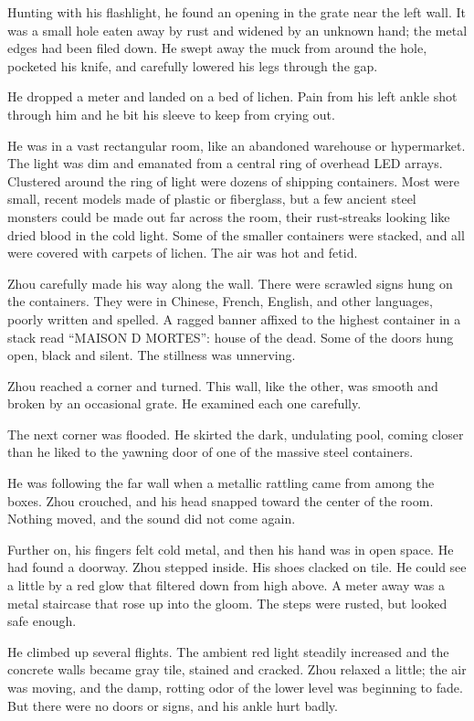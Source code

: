 \documentclass[10pt,b5paper]{article}
\begin{document}
Hunting with his flashlight, he found an opening in the grate near
the left wall. It was a small hole eaten away by rust and widened by
an unknown hand; the metal edges had been filed down. He swept away
the muck from around the hole, pocketed his knife, and carefully
lowered his legs through the gap.

He dropped a meter and landed on a bed of lichen. Pain from his left
ankle shot through him and he bit his sleeve to keep from crying out.

He was in a vast rectangular room, like an abandoned warehouse or
hypermarket. The light was dim and emanated from a central ring of
overhead LED arrays. Clustered around the ring of light were dozens
of shipping containers. Most were small, recent models made of
plastic or fiberglass, but a few ancient steel monsters could be made
out far across the room, their rust-streaks looking like dried blood
in the cold light. Some of the smaller containers were stacked, and
all were covered with carpets of lichen. The air was hot and fetid.

Zhou carefully made his way along the wall. There were scrawled
signs hung on the containers. They were in Chinese, French, English,
and other languages, poorly written and spelled. A ragged banner
affixed to the highest container in a stack read ``MAISON D MORTES'':
house of the dead. Some of the doors hung open, black and silent. The
stillness was unnerving.

Zhou reached a corner and turned. This wall, like the other,
was smooth and broken by an occasional grate. He examined each
one carefully.

The next corner was flooded. He skirted the dark, undulating pool,
coming closer than he liked to the yawning door of one of the
massive steel containers.

He was following the far wall when a metallic rattling came from
among the boxes. Zhou crouched, and his head snapped toward the
center of the room. Nothing moved, and the sound did not come again.

Further on, his fingers felt cold metal, and then his hand was in
open space. He had found a doorway. Zhou stepped inside. His shoes
clacked on tile. He could see a little by a red glow that filtered
down from high above. A meter away was a metal staircase that rose
up into the gloom. The steps were rusted, but looked safe enough.

He climbed up several flights. The ambient red light steadily
increased and the concrete walls became gray tile, stained and
cracked. Zhou relaxed a little; the air was moving, and the damp,
rotting odor of the lower level was beginning to fade. But there
were no doors or signs, and his ankle hurt badly.
\end{document}
